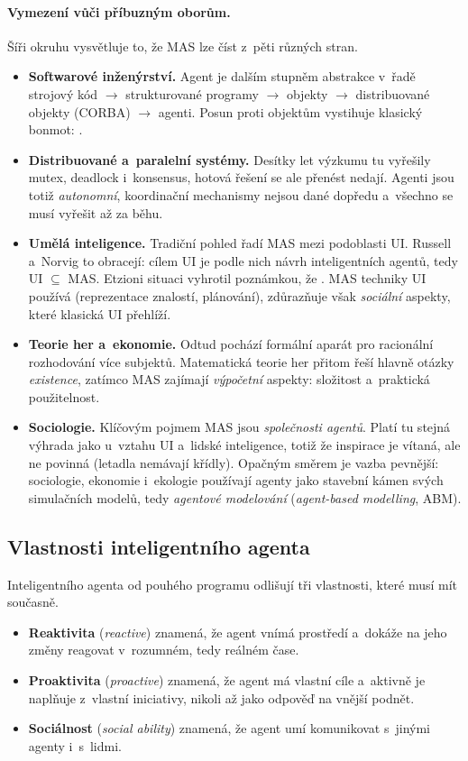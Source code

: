 \documentclass[11pt,a4paper]{article}
\theoremstyle{definition}
\begin{document}
\paragraph{Vymezení vůči příbuzným oborům.} Šíři okruhu vysvětluje to, že MAS lze číst
z~pěti různých stran.
\begin{itemize}
\item \textbf{Softwarové inženýrství.} Agent je dalším stupněm abstrakce v~řadě
  strojový kód $\to$ strukturované programy $\to$ objekty $\to$ distribuované objekty (CORBA)
  $\to$ agenti. Posun proti objektům vystihuje klasický bonmot: .
\item \textbf{Distribuované a~paralelní systémy.} Desítky let výzkumu tu vyřešily mutex,
  deadlock i~konsensus, hotová řešení se ale přenést nedají. Agenti jsou totiž \emph{autonomní},
  koordinační mechanismy nejsou dané dopředu a~všechno se musí vyřešit až za běhu.
\item \textbf{Umělá inteligence.} Tradiční pohled řadí MAS mezi podoblasti UI. Russell a~Norvig
  to obracejí: cílem UI je podle nich návrh inteligentních agentů, tedy UI $\subseteq$ MAS.
  Etzioni situaci vyhrotil poznámkou, že . MAS techniky
  UI používá (reprezentace znalostí, plánování), zdůrazňuje však \emph{sociální} aspekty, které
  klasická UI přehlíží.
\item \textbf{Teorie her a~ekonomie.} Odtud pochází formální aparát pro racionální rozhodování
  více subjektů. Matematická teorie her přitom řeší hlavně otázky \emph{existence}, zatímco MAS
  zajímají \emph{výpočetní} aspekty: složitost a~praktická použitelnost.
\item \textbf{Sociologie.} Klíčovým pojmem MAS jsou \emph{společnosti agentů}. Platí tu stejná
  výhrada jako u~vztahu UI a~lidské inteligence, totiž že inspirace je vítaná, ale ne povinná
  (letadla nemávají křídly). Opačným směrem je vazba pevnější: sociologie, ekonomie i~ekologie
  používají agenty jako stavební kámen svých simulačních modelů, tedy \emph{agentové modelování}
  (\emph{agent-based modelling}, ABM).
\end{itemize}

\subsection{Vlastnosti inteligentního agenta}

Inteligentního agenta od pouhého programu odlišují tři vlastnosti, které musí mít současně.
\begin{itemize}
\item \textbf{Reaktivita} (\emph{reactive}) znamená, že agent vnímá prostředí a~dokáže na jeho
  změny reagovat v~rozumném, tedy reálném čase.
\item \textbf{Proaktivita} (\emph{proactive}) znamená, že agent má vlastní cíle a~aktivně je
  naplňuje z~vlastní iniciativy, nikoli až jako odpověď na vnější podnět.
\item \textbf{Sociálnost} (\emph{social ability}) znamená, že agent umí komunikovat s~jinými
  agenty i~s~lidmi.
\end{itemize}
\end{document}
